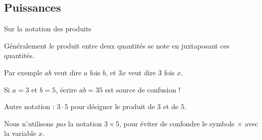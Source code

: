 \documentclass[french,xcolor=svgnames]{beamer}
\begin{document}
\subsection{Puissances}\label{sec-puissances}
\begin{frame}{Sur la notation des produits}
  \begin{block}{}
    Généralement le produit entre deux quantités se note en juxtaposant ces quantités.
  \end{block}\pause{}

  \begin{example}
    Par exemple \(ab\) veut dire \og \(a\) fois \(b\)\fg{},\pause{} et \(3 x\) veut dire \og \(3\) fois \(x\)\fg{}.
  \end{example}\pause

  \begin{example}
    Si \(a = 3\) et \(b = 5\),\pause{} écrire \(ab = 35\) est source de confusion !\pause
      
    Autre notation\pause{} : \(3\cdot 5\) pour désigner le produit de \(3\) et de \(5\).\pause{}

    Nous n'utilisons \emph{pas} la notation \(3\times 5\),\pause{} pour éviter de confondre le symbole \(\times\) avec la variable \(x\).
  \end{example}
\end{frame}
\end{document}
